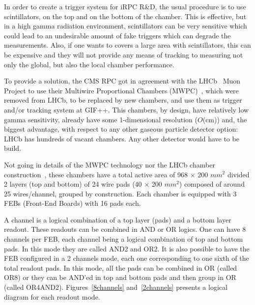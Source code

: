 In order to create a trigger system for iRPC R\&D, the usual procedure is to use scintillators, on the top and on the bottom of the chamber. This is effective, but in a high gamma radiation environment, scintillators can be very sensitive which could lead to an undesirable amount of fake triggers which can degrade the measurements. Also, if one wants to covers a large area with scintillators, this can be expensive and they will not provide any means of tracking to measuring not only the global, but also the local chamber performance.

To provide a solution, the CMS RPC got in agreement with the LHCb~\cite{lhcb} Muon Project to use their Multiwire Proportional Chambers (MWPC)~\cite{mwpc}, which were removed from LHCb, to be replaced by new chambers, and use them as trigger and/or tracking system at GIF++. This chambers, by design, have relatively low gamma sensitivity, already have some 1-dimensional resolution ($O$(cm)) and, the biggest advantage, with respect to any other gaseous particle detector option: LHCb has hundreds of vacant chambers. Any other detector would have to be build.

Not going in details of the MWPC technology nor the LHCb chamber construction~\cite{lhcb_mwpc}, these chambers have a total active area of 968 $\times$ 200 $mm^2$ divided 2 layers (top and bottom) of 24 wire pads (40 $\times$ 200 $mm^2$) composed of around 25 wires/channel, grouped by construction. Each chamber is equipped with 3 FEBs (Front-End Boards) with 16 pads each.

A channel is a logical combination of a top layer (pads) and a bottom layer readout. These readouts can be combined in AND or OR logics. One can have 8 channels per FEB, each channel being a logical combination of top and bottom pads. In this mode they are called AND2 and OR2. It is also possible to have the FEB configured in a 2 channels mode, each one corresponding to one sixth of the total readout pads. In this mode, all the pads can be combined in OR (called OR8) or they can be AND'ed in top and bottom pads and then group in OR (called OR4AND2). Figures~\ref{8channels} and~\ref{2channels} presents a logical diagram for each readout mode.

